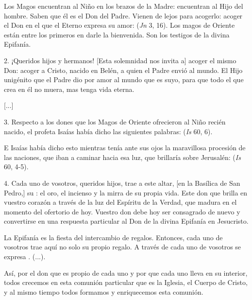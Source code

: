 \begin{body}
	Los Magos encuentran al Niño en los brazos de la Madre: encuentran al Hijo del hombre. Saben que él es el Don del Padre. Vienen de lejos para acogerlo: acoger el Don en el que el Eterno expresa su amor:  (\emph{Jn} 3, 16). Los magos de Oriente están entre los primeros en darle la bienvenida. Son los testigos de la divina Epifanía.
	
	2. ¡Queridos hijos y hermanos! {[}Esta solemnidad nos invita a{]} acoger el mismo Don: acoger a Cristo, nacido en Belén, a quien el Padre envió al mundo. El Hijo unigénito que el Padre dio por amor al mundo que es suyo, para que todo el que crea en él no muera, mas tenga vida eterna.
	
	{[}...{]}
	
	3. Respecto a los dones que los Magos de Oriente ofrecieron al Niño recién nacido, el profeta Isaías había dicho las siguientes palabras:  (\emph{Is} 60, 6).
	
	E Isaías había dicho esto mientras tenía ante sus ojos la maravillosa procesión de las naciones, que iban a caminar hacia esa luz, que brillaría sobre Jerusalén:  (\emph{Is} 60, 4-5).
	
	4. Cada uno de vosotros, queridos hijos, trae a este altar, {[}en la Basílica de San Pedro,{]} su : el oro, el incienso y la mirra de su propia vida. Este don que brilla en vuestro corazón a través de la luz del Espíritu de la Verdad, que madura en el momento del ofertorio de hoy. Vuestro don debe hoy ser consagrado de nuevo y convertirse en una respuesta particular al Don de la divina Epifanía en Jesucristo.
	
	La Epifanía es la fiesta del intercambio de regalos. Entonces, cada uno de vosotros trae aquí no solo su propio regalo. A través de cada uno de vosotros se expresa . (...).
	
	Así, por el don que es propio de cada uno y por  que cada uno lleva en su interior, todos crecemos en esta comunión particular que es la Iglesia, el Cuerpo de Cristo, y al mismo tiempo todos formamos y enriquecemos esta comunión.
	

\end{body}
